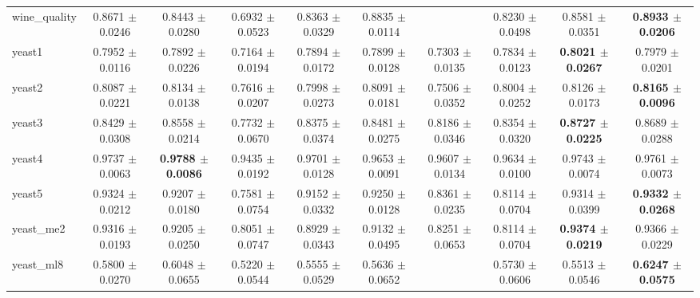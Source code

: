 \begin{table*}[htbp]
\begin{tabular}{lccccccccc}
            wine\_quality & 0.8671 $\pm$ 0.0246 & 0.8443 $\pm$ 0.0280 & 0.6932 $\pm$ 0.0523 & 0.8363 $\pm$ 0.0329 & 0.8835 $\pm$ 0.0114 &  & 0.8230 $\pm$ 0.0498 & 0.8581 $\pm$ 0.0351 & \cellcolor{graybg}\textbf{0.8933 $\pm$ 0.0206} \\ 
            yeast1 & 0.7952 $\pm$ 0.0116 & 0.7892 $\pm$ 0.0226 & 0.7164 $\pm$ 0.0194 & 0.7894 $\pm$ 0.0172 & 0.7899 $\pm$ 0.0128 & 0.7303 $\pm$ 0.0135 & 0.7834 $\pm$ 0.0123 & \cellcolor{graybg}\textbf{0.8021 $\pm$ 0.0267} & 0.7979 $\pm$ 0.0201 \\ 
            yeast2 & 0.8087 $\pm$ 0.0221 & 0.8134 $\pm$ 0.0138 & 0.7616 $\pm$ 0.0207 & 0.7998 $\pm$ 0.0273 & 0.8091 $\pm$ 0.0181 & 0.7506 $\pm$ 0.0352 & 0.8004 $\pm$ 0.0252 & 0.8126 $\pm$ 0.0173 & \cellcolor{graybg}\textbf{0.8165 $\pm$ 0.0096} \\ 
            yeast3 & 0.8429 $\pm$ 0.0308 & 0.8558 $\pm$ 0.0214 & 0.7732 $\pm$ 0.0670 & 0.8375 $\pm$ 0.0374 & 0.8481 $\pm$ 0.0275 & 0.8186 $\pm$ 0.0346 & 0.8354 $\pm$ 0.0320 & \cellcolor{graybg}\textbf{0.8727 $\pm$ 0.0225} & 0.8689 $\pm$ 0.0288 \\ 
            yeast4 & 0.9737 $\pm$ 0.0063 & \cellcolor{graybg}\textbf{0.9788 $\pm$ 0.0086} & 0.9435 $\pm$ 0.0192 & 0.9701 $\pm$ 0.0128 & 0.9653 $\pm$ 0.0091 & 0.9607 $\pm$ 0.0134 & 0.9634 $\pm$ 0.0100 & 0.9743 $\pm$ 0.0074 & 0.9761 $\pm$ 0.0073 \\ 
            yeast5 & 0.9324 $\pm$ 0.0212 & 0.9207 $\pm$ 0.0180 & 0.7581 $\pm$ 0.0754 & 0.9152 $\pm$ 0.0332 & 0.9250 $\pm$ 0.0128 & 0.8361 $\pm$ 0.0235 & 0.8114 $\pm$ 0.0704 & 0.9314 $\pm$ 0.0399 & \cellcolor{graybg}\textbf{0.9332 $\pm$ 0.0268} \\ 
            yeast\_me2 & 0.9316 $\pm$ 0.0193 & 0.9205 $\pm$ 0.0250 & 0.8051 $\pm$ 0.0747 & 0.8929 $\pm$ 0.0343 & 0.9132 $\pm$ 0.0495 & 0.8251 $\pm$ 0.0653 & 0.8114 $\pm$ 0.0704 & \cellcolor{graybg}\textbf{0.9374 $\pm$ 0.0219} & 0.9366 $\pm$ 0.0229 \\ 
            yeast\_ml8 & 0.5800 $\pm$ 0.0270 & 0.6048 $\pm$ 0.0655 & 0.5220 $\pm$ 0.0544 & 0.5555 $\pm$ 0.0529 & 0.5636 $\pm$ 0.0652 &  & 0.5730 $\pm$ 0.0606 & 0.5513 $\pm$ 0.0546 & \cellcolor{graybg}\textbf{0.6247 $\pm$ 0.0575} \\ 
        \bottomrule
    \end{tabular}
\end{table*}
